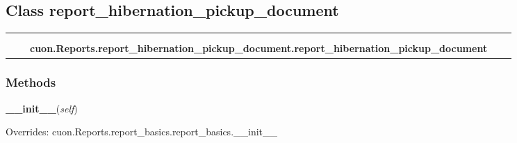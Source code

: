 \subsection{Class report\_hibernation\_pickup\_document}

    \label{cuon:Reports:report_hibernation_pickup_document:report_hibernation_pickup_document}
\begin{tabular}{cccccc}
\multicolumn{2}{r}{\settowidth{\BCL}{cuon.Reports.report\_basics.report\_basics}\multirow{2}{\BCL}{cuon.Reports.report\_basics.report\_basics}}
&&
  \\\cline{3-3}
  &&\multicolumn{1}{c|}{}
&&
  \\
&&\multicolumn{2}{l}{\textbf{cuon.Reports.report\_hibernation\_pickup\_document.report\_hibernation\_pickup\_document}}
\end{tabular}



  \subsubsection{Methods}

    \vspace{0.5ex}

\hspace{.8\funcindent}\begin{boxedminipage}{\funcwidth}

    \raggedright \textbf{\_\_init\_\_}(\textit{self})

\setlength{\parskip}{2ex}
\setlength{\parskip}{1ex}
      Overrides: cuon.Reports.report\_basics.report\_basics.\_\_init\_\_

    \end{boxedminipage}

    \label{cuon:Reports:report_hibernation_pickup_document:report_hibernation_pickup_document:getReportData}

